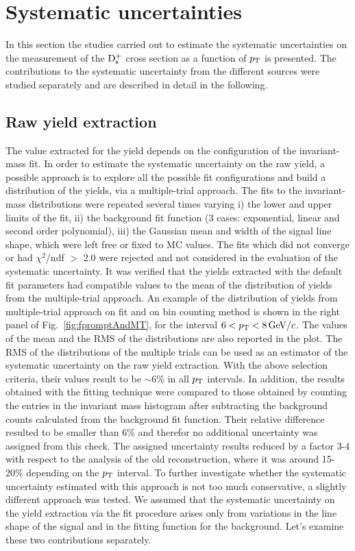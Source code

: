 \section{Systematic uncertainties}
\label{sec:systPP}
In this section the studies carried out to estimate the systematic uncertainties on the
 measurement of the ${\rm D_s^+}$ cross section as a function of $p_{\rm T}$ is presented. 
 The contributions to the systematic uncertainty from the different 
 sources were studied separately and are described in detail in the following.

\subsection{Raw yield extraction}
\label{sec:RawYieldSyst}
The value extracted for the yield depends on the  
configuration of the invariant-mass fit.
In order to estimate the systematic uncertainty on the raw yield,
a possible approach is to explore all the possible fit configurations and build
a distribution of the yields, via a multiple-trial approach. The fits to the invariant-mass 
distributions were repeated several times varying
i) the lower and upper limits of the fit, 
ii) the background fit function (3 cases: exponential, linear and second 
order polynomial), iii) the Gaussian mean and width of the signal line shape, 
which were left free or fixed to MC
values. The fits which did not converge or had $\chi^2$/ndf $>$ 2.0 
were rejected and not considered in the evaluation of the 
systematic uncertainty. It was verified that the yields extracted with the
default fit parameters had compatible values to the mean of
the distribution of yields from the multiple-trial approach. 
An example of the distribution of yields from multiple-trial approach on fit and on
bin counting method is shown in the right panel of Fig.~\ref{fig:fpromptAndMT},
for the interval $6 < p_{\rm T} < 8 \, \mathrm{GeV}/c$. The values of the mean and the RMS
of the distributions are also reported in the plot.
The RMS of the distributions of the multiple trials can be used as an estimator of
the systematic uncertainty on the raw yield extraction. With the above
selection criteria, their values result to be $\sim$6\% in all $p_{\rm T}$ intervals.
In addition, the results obtained with 
the fitting technique were compared to those obtained by 
counting the entries in the invariant mass histogram after 
subtracting the background counts calculated from the 
background fit function. Their relative difference resulted
to be smaller than 6\% and therefor no additional uncertainty was assigned from this check. 
The assigned uncertainty results reduced by a factor 3-4 with respect to the analysis of the old reconstruction,
where it was around 15-20\% depending on the $p_{\rm T}$ interval. 
To further investigate whether the systematic uncertainty estimated with
this approach is not too much conservative, a slightly
different approach was tested. We assumed that 
the systematic uncertainty on the yield extraction via the fit procedure 
arises only from variations in the line shape of the signal and 
in the fitting function for the 
background. Let's examine these two contributions separately.\\

